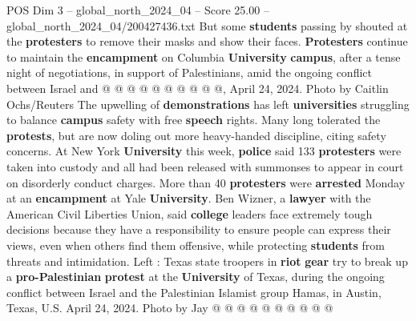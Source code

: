 \begin{textsample}{POS Dim 3 – global\_north\_2024\_04 – Score 25.00 – global\_north\_2024\_04/200427436.txt}
But some \textbf{students} passing by shouted at the \textbf{protesters} to remove their masks and show their faces. \textbf{Protesters} continue to maintain the \textbf{encampment} on Columbia \textbf{University} \textbf{campus}, after a tense night of negotiations, in support of Palestinians, amid the ongoing conflict between Israel and @ @ @ @ @ @ @ @ @ @, April 24, 2024.
Photo by Caitlin Ochs/Reuters The upwelling of \textbf{demonstrations} has left \textbf{universities} struggling to balance \textbf{campus} safety with free \textbf{speech} rights.
Many long tolerated the \textbf{protests}, but are now doling out more heavy-handed discipline, citing safety concerns.
At New York \textbf{University} this week, \textbf{police} said 133 \textbf{protesters} were taken into custody and all had been released with summonses to appear in court on disorderly conduct charges.
More than 40 \textbf{protesters} were \textbf{arrested} Monday at an \textbf{encampment} at Yale \textbf{University}.
Ben Wizner, a \textbf{lawyer} with the American Civil Liberties Union, said \textbf{college} leaders face extremely tough decisions because they have a responsibility to ensure people can express their views, even when others find them offensive, while protecting \textbf{students} from threats and intimidation.
Left : Texas state troopers in \textbf{riot} \textbf{gear} try to break up a \textbf{pro-Palestinian} \textbf{protest} at the \textbf{University} of Texas, during the ongoing conflict between Israel and the Palestinian Islamist group Hamas, in Austin, Texas, U.S.
April 24, 2024.
Photo by Jay @ @ @ @ @ @ @ @ @ @

\end{textsample}
